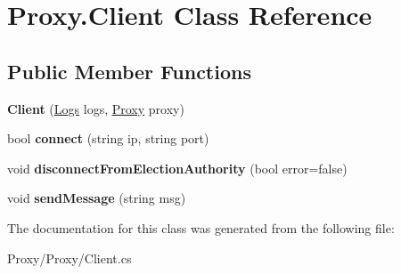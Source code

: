 \hypertarget{class_proxy_1_1_client}{}\section{Proxy.\+Client Class Reference}
\label{class_proxy_1_1_client}
\subsection*{Public Member Functions}
\begin{DoxyCompactItemize}
\item 
\hypertarget{class_proxy_1_1_client_a0b9f5bc482c4a292dcbd4cf3307b32c0}{}{\bfseries Client} (\hyperlink{class_proxy_1_1_logs}{Logs} logs, \hyperlink{class_proxy_1_1_proxy}{Proxy} proxy)\label{class_proxy_1_1_client_a0b9f5bc482c4a292dcbd4cf3307b32c0}

\item 
\hypertarget{class_proxy_1_1_client_a3b0cfe950b29d5d5a877fccc36be0042}{}bool {\bfseries connect} (string ip, string port)\label{class_proxy_1_1_client_a3b0cfe950b29d5d5a877fccc36be0042}

\item 
\hypertarget{class_proxy_1_1_client_a3e33c0d5c28a731797a8b80932f5c2d9}{}void {\bfseries disconnect\+From\+Election\+Authority} (bool error=false)\label{class_proxy_1_1_client_a3e33c0d5c28a731797a8b80932f5c2d9}

\item 
\hypertarget{class_proxy_1_1_client_a61344d448e185f8aa04530c6fb844553}{}void {\bfseries send\+Message} (string msg)\label{class_proxy_1_1_client_a61344d448e185f8aa04530c6fb844553}

\end{DoxyCompactItemize}


The documentation for this class was generated from the following file\+:\begin{DoxyCompactItemize}
\item 
Proxy/\+Proxy/Client.\+cs\end{DoxyCompactItemize}
